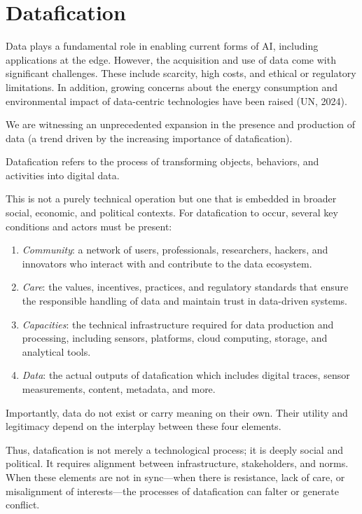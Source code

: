 \section{Datafication}

Data plays a fundamental role in enabling current forms of AI, including applications at the edge. However, the acquisition and use of data come with significant challenges. 
These include scarcity, high costs, and ethical or regulatory limitations. 
In addition, growing concerns about the energy consumption and environmental impact of data-centric technologies have been raised (UN, 2024).

We are witnessing an unprecedented expansion in the presence and production of data (a trend driven by the increasing importance of datafication).
\begin{definition}
    Datafication refers to the process of transforming objects, behaviors, and activities into digital data.
\end{definition}
\noindent This is not a purely technical operation but one that is embedded in broader social, economic, and political contexts.
For datafication to occur, several key conditions and actors must be present:
\begin{enumerate}
    \item \textit{Community}: a network of users, professionals, researchers, hackers, and innovators who interact with and contribute to the data ecosystem.
    \item \textit{Care}: the values, incentives, practices, and regulatory standards that ensure the responsible handling of data and maintain trust in data-driven systems.
    \item \textit{Capacities}: the technical infrastructure required for data production and processing, including sensors, platforms, cloud computing, storage, and analytical tools.
    \item \textit{Data}: the actual outputs of datafication which includes digital traces, sensor measurements, content, metadata, and more.
\end{enumerate}
Importantly, data do not exist or carry meaning on their own. 
Their utility and legitimacy depend on the interplay between these four elements.

Thus, datafication is not merely a technological process; it is deeply social and political. 
It requires alignment between infrastructure, stakeholders, and norms. 
When these elements are not in sync—when there is resistance, lack of care, or misalignment of interests—the processes of datafication can falter or generate conflict.